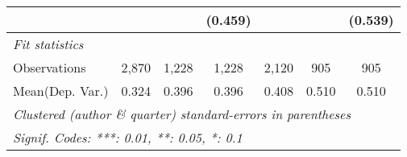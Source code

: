 \begin{tabular}{lcccccc}
                           &             &         & (0.459)      &              &         & (0.539)\\   
   \midrule
   \emph{Fit statistics}\\
   Observations            & 2,870       & 1,228   & 1,228        & 2,120        & 905     & 905\\  
Mean(Dep. Var.) & 0.324 & 0.396 & 0.396 & 0.408 & 0.510 & 0.510 \\
   \midrule \midrule
   \multicolumn{7}{l}{\emph{Clustered (author \& quarter) standard-errors in parentheses}}\\
   \multicolumn{7}{l}{\emph{Signif. Codes: ***: 0.01, **: 0.05, *: 0.1}}\\
\end{tabular}
\par\endgroup
